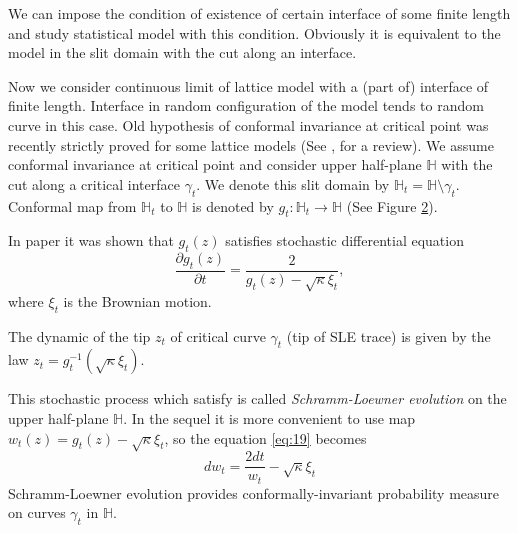 \documentclass[a4paper]{jpconf}
\theoremstyle{definition}
\theoremstyle{definition} \newtheorem{Def}{Definition}
\begin{document}
\begin{figure}[h]
  \label{fig:sle}
\end{figure}
We can impose the condition of existence of certain interface of some finite length and study statistical model with this condition. Obviously it is equivalent to the model in the slit domain with the cut along an interface. 

Now we consider continuous limit of lattice model with a (part of) interface of finite length. Interface in random configuration of the model tends to random curve in this case. Old hypothesis \cite{Polyakov:1970xd} of conformal invariance at critical point was recently strictly proved for some lattice models (See \cite{smirnov2007towards}, \cite{duminil2011conformal} for a review). We assume conformal invariance at critical point and consider upper half-plane $\mathbb{H}$ with the cut along a critical interface $\gamma_{t}$. We denote this slit domain by $\mathbb{H}_{t}=\mathbb{H}\setminus \gamma_{t}$. Conformal map from $\mathbb{H}_{t}$ to $\mathbb{H}$ is denoted by $g_{t}:\mathbb{H}_{t}\to \mathbb{H}$ (See Figure \ref{fig:sle2}).

\begin{figure}[h]
  \label{fig:sle2}
\end{figure}

In paper \cite{schramm2000scaling} it was shown that $g_{t}(z)$ satisfies stochastic differential equation 
\begin{equation}
\label{eq:19}
  \frac{\partial g_t(z)}{\partial t} = \frac{ 2}{g_t(z)-\sqrt{\kappa}\xi_{t}} ,
\end{equation}
where $\xi_{t}$ is the Brownian motion.

The dynamic of the tip $z_{t}$ of critical curve $\gamma_{t}$ (tip of SLE trace) is given by the law $z_{t}=g_{t}^{-1}(\sqrt{\kappa}\xi_{t})$. 

This stochastic process which satisfy is called     {\it Schramm-Loewner evolution} on the upper half-plane $\mathbb{H}$.
In the sequel it is more convenient to use map $w_{t} (z)=g_{t}(z)-\sqrt{\kappa}\xi_{t}$, so the equation \eqref{eq:19} becomes
\begin{equation}
  \label{eq:20}
       d w _{t}= \frac{2dt}{w_{t} }-\sqrt{\kappa}\xi_{t}  
\end{equation}
Schramm-Loewner evolution provides conformally-invariant probability measure on curves $\gamma_{t}$ in $\mathbb{H}$.
\end{document}
